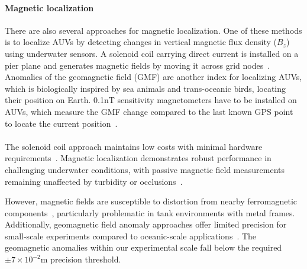 \documentclass[11pt]{article}
\begin{document}
        \paragraph{Magnetic localization}
        There are also several approaches for magnetic localization. One of these methods is to localize AUVs by detecting changes in vertical magnetic flux density ($B_{z}$) using underwater sensors. A solenoid coil carrying direct current is installed on a pier plane and generates magnetic fields by moving it across grid nodes~\cite{zhou_localization_2022}. Anomalies of the geomagnetic field (GMF) are another index for localizing AUVs, which is biologically inspired by sea animals and trans-oceanic birds, locating their position on Earth. 0.1nT sensitivity magnetometers have to be installed on AUVs, which measure the GMF change compared to the last known GPS point to locate the current position~\cite{gidugu_bio-inspired_2024}.\\\\
        The solenoid coil approach maintains low costs with minimal hardware requirements~\cite{zhou_localization_2022}. Magnetic localization demonstrates robust performance in challenging underwater conditions, with passive magnetic field measurements remaining unaffected by turbidity or occlusions~\cite{gidugu_bio-inspired_2024,zhou_localization_2022}.

        However, magnetic fields are susceptible to distortion from nearby ferromagnetic components~\cite{zhou_localization_2022}, particularly problematic in tank environments with metal frames. Additionally, geomagnetic field anomaly approaches offer limited precision for small-scale experiments compared to oceanic-scale applications~\cite{gidugu_bio-inspired_2024}. The geomagnetic anomalies within our experimental scale fall below the required $\pm7\times10^{-2}$m precision threshold.
\end{document}
